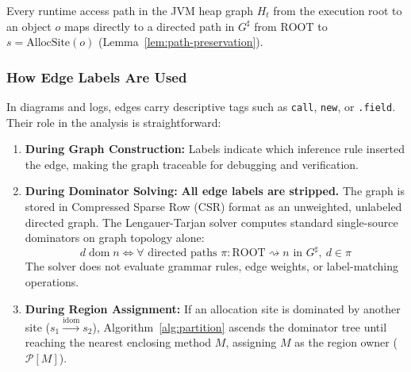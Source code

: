 \documentclass[12pt,a4paper]{article}
\newcommand{\ROOT}{\text{ROOT}}
\newcommand{\idom}{\text{idom}}
\newcommand{\dom}{\mathrel{\text{dom}}}
\begin{document}
Every runtime access path in the JVM heap graph $H_t$ from the execution root to an object $o$ maps directly to a directed path in $G^\sharp$ from $\ROOT$ to $s = \text{AllocSite}(o)$ (Lemma~\ref{lem:path-preservation}).

\subsubsection{How Edge Labels Are Used}

In diagrams and logs, edges carry descriptive tags such as \texttt{call}, \texttt{new}, or \texttt{.field}. Their role in the analysis is straightforward:

\begin{enumerate}[leftmargin=*]
  \item \textbf{During Graph Construction:} Labels indicate which inference rule inserted the edge, making the graph traceable for debugging and verification.
  \item \textbf{During Dominator Solving:} \textbf{All edge labels are stripped.} The graph is stored in Compressed Sparse Row (CSR) format as an unweighted, unlabeled directed graph. The Lengauer-Tarjan solver computes standard single-source dominators on graph topology alone:
  \[
  d \dom n \iff \forall \text{ directed paths } \pi: \ROOT \rightsquigarrow n \text{ in } G^\sharp, \ d \in \pi
  \]
  The solver does not evaluate grammar rules, edge weights, or label-matching operations.
  \item \textbf{During Region Assignment:} If an allocation site is dominated by another site ($s_1 \xrightarrow{\idom} s_2$), Algorithm~\ref{alg:partition} ascends the dominator tree until reaching the nearest enclosing method $M$, assigning $M$ as the region owner ($\mathcal{P}[M]$).
\end{enumerate}
\end{document}
